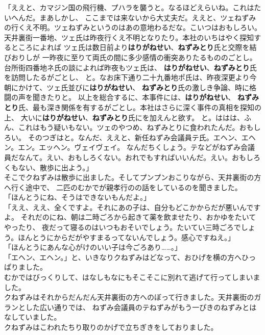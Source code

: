 \documentclass[
a4paper,
10pt,
book]
{tarticle}
\begin{document}
「ええと、カマジン国の飛行機、プハラを襲うと。なるほどえらいね。これはたいへんだ。まあしかし、
ここまでは来ないから大丈夫だ。ええと、ツェねずみの行くえ不明。ツェねずみというのはあの意地わるだな。こいつはおもしろい。\\
\indent 天井裏街一番地、ツェ氏は昨夜行くえ不明となりたり。本社のいちはやく探知するところによれば
ツェ氏は数日前より\textbf{はりがねせい}、\textbf{ねずみとり}氏と交際を結びおりしが
一昨夜に至りて両氏の間に多少感情の衝突ありたるもののごとし。台所街四番地ネ氏の談によれば昨夜もツェ氏は、
\textbf{はりがねせい}、\textbf{ねずみとり}氏を訪問したるがごとし、
と。なお床下通り二十九番地ポ氏は、昨夜深更より今朝にかけて、ツェ氏並びに\textbf{はりがねせい}、
\textbf{ねずみとり}氏の激しき争論、時に格闘の声を聞きたりと。
以上を総合するに、本事件には、\textbf{はりがねせい}、
\textbf{ねずみとり}氏、最も深き関係を有するがごとし。本社はさらに深く事件の真相を探知の上、
大いに\textbf{はりがねせい}、\textbf{ねずみとり}氏にを加えんと欲す。
と。ははは、ふん、これはもう疑いもない。ツェのやつめ、ねずみとりに食われたんだ。おもしろい。
そのつぎはと。なんだ、ええと、新任ねずみ会議員テ氏。エヘン、エヘン。エン。エッヘン。ヴェイヴェイ。
なんだちくしょう。テなどがねずみ会議員だなんて。えい、おもしろくない。おれでもすればいいんだ。えい。おもしろくもない、散歩に出よう。」\\
\newpage
\indent そこでクねずみは散歩に出ました。そしてプンプンおこりながら、天井裏街の方へ行く途中で、
二匹のむかでが親孝行のの話をしているのを聞きました。\indent \\
「ほんとうにね、そうはできないもんだよ。」\\
「ええ、ええ、全くですよ。それにあの子は、自分もどこかからだが悪いんですよ。
それだのにね、朝は二時ごろから起きて薬を飲ませたり、おかゆをたいてやったり、
夜だって寝るのはいつもおそいでしょう。たいてい三時ごろでしょう。ほんとうにからだがやすまるってないんでしょう。感心ですねえ。」\\
「ほんとうにあんな心がけのいい子は今ごろあり……。」\\
「エヘン、エヘン。」と、いきなりクねずみはどなって、おひげを横の方へひっぱりました。\\
\indent むかではびっくりして、はなしもなにもそこそこに別れて逃げて行ってしまいました。\\
\indent クねずみはそれからだんだん天井裏街の方へのぼって行きました。天井裏街のガランとした広い通りでは、
ねずみ会議員のテねずみがもう一ぴきのねずみとはなしていました。\\
\indent クねずみはこわれたちり取りのかげで立ちぎきをしておりました。\\
\end{document}
